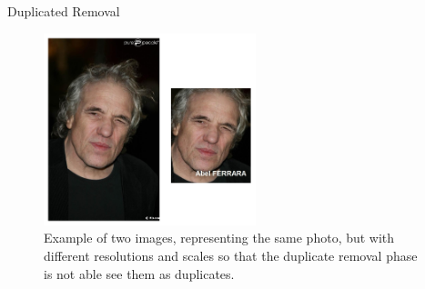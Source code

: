\begin{tframe}{Duplicated Removal}

\begin{figure}[h]
\begin{center}
\includegraphics[width=0.55\textwidth]{images/image6.png}
\end{center}
  \caption{Example of two images, representing the same photo, but with different resolutions and scales so that the duplicate removal phase is not able see them as duplicates.}
\label{fig:validation}
\end{figure}

\end{tframe}